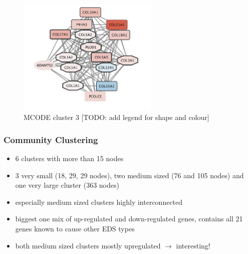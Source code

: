 \begin{figure}[htb!]
	\centering
	\includegraphics[width=0.6\textwidth]{fig/MCODE-cluster3.png}
	\caption{MCODE cluster 3 [TODO: add legend for shape and colour]}
	\label{fig:mcode3}
\end{figure}

\subsubsection{Community Clustering}

\begin{itemize}
	\item 6 clusters with more than 15 nodes
	\item 3 very small (18, 29, 29 nodes), two medium sized (76 and 105 nodes) and one very large cluster (363 nodes)
	\item especially medium sized clusters highly interconnected
	\item biggest one mix of up-regulated and down-regulated genes, contains all 21 genes known to cause other EDS types
	\item both medium sized clusters mostly upregulated $\rightarrow$ interesting!
\end{itemize}